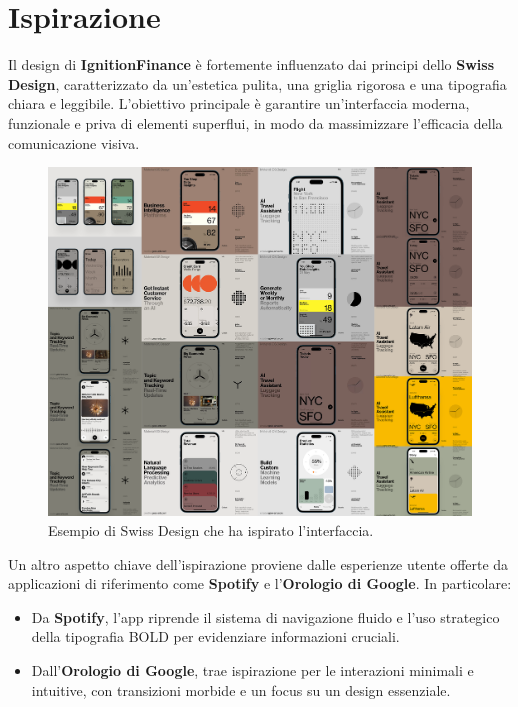 \documentclass{article}
\begin{document}
\section{Ispirazione}\label{sec:ispirazione}

Il design di \textbf{IgnitionFinance} è fortemente influenzato dai principi
dello \textbf{Swiss Design}, caratterizzato da un'estetica pulita, una griglia
rigorosa e una tipografia chiara e leggibile.
L'obiettivo principale è garantire
un'interfaccia moderna, funzionale e priva di elementi superflui, in modo da
massimizzare l'efficacia della comunicazione visiva.

\begin{figure}[H]
    \centering
    \includegraphics[width=1\textwidth]{foto/swiss_design}
    \caption{Esempio di Swiss Design che ha ispirato l’interfaccia.}
    \label{fig:swiss_design}
\end{figure}

\vspace{\baselineskip}

Un altro aspetto chiave dell'ispirazione proviene dalle esperienze utente
offerte da applicazioni di riferimento come \textbf{Spotify} e
l’\textbf{Orologio di Google}.
In particolare:
\begin{itemize}
    \item Da \textbf{Spotify}, l'app riprende il sistema di navigazione fluido e
    l'uso strategico della tipografia BOLD per evidenziare informazioni
    cruciali.
    \item Dall’\textbf{Orologio di Google}, trae ispirazione per le interazioni
    minimali e intuitive, con transizioni morbide e un focus su un design
    essenziale.
\end{itemize}
\end{document}
